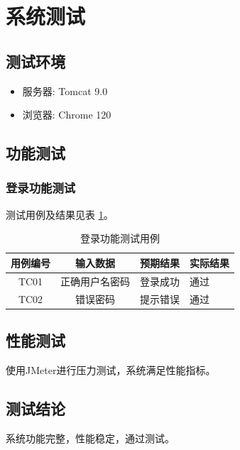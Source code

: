 \section{系统测试}

\subsection{测试环境}
\begin{itemize}[nosep, leftmargin=2em]
    \item 服务器: Tomcat 9.0
    \item 浏览器: Chrome 120
\end{itemize}

\subsection{功能测试}
\subsubsection{登录功能测试}
测试用例及结果见表 \ref{tbl:login_test}。

\begin{table}[H]
    \centering
    \caption{登录功能测试用例}
    \label{tbl:login_test}
    \begin{tabular}{cccl}
        \toprule
        用例编号 & 输入数据 & 预期结果 & 实际结果 \\
        \midrule
        TC01 & 正确用户名密码 & 登录成功 & 通过 \\
        TC02 & 错误密码 & 提示错误 & 通过 \\
        \bottomrule
    \end{tabular}
\end{table}

\subsection{性能测试}
使用JMeter进行压力测试，系统满足性能指标。

\subsection{测试结论}
系统功能完整，性能稳定，通过测试。